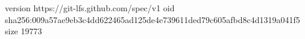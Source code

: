 version https://git-lfs.github.com/spec/v1
oid sha256:009a57ae9eb3c4dd622465ad125de4e739611ded79c605afbd8c4d1319a041f5
size 19773
